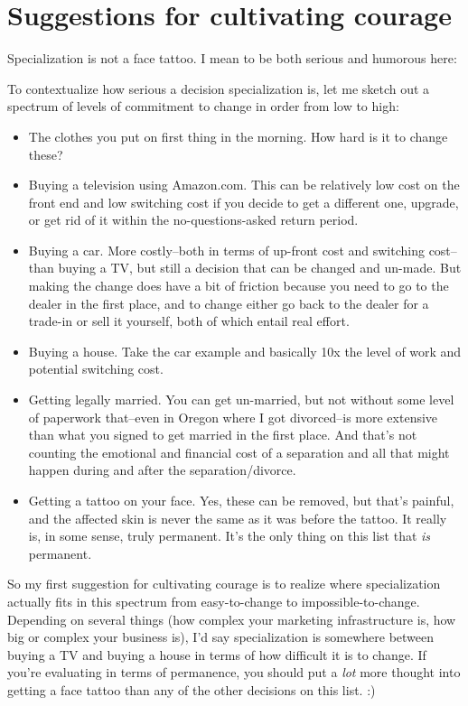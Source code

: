 \section{Suggestions for cultivating courage}

Specialization is not a face tattoo. I mean to be both serious and humorous here:

To contextualize how serious a decision specialization is, let me sketch out a spectrum of levels of commitment  to change in order from low to high:

\begin{itemize}
\item The clothes you put on first thing in the morning. How hard is it to change these?
\item Buying a television using Amazon.com. This can be relatively low cost on the front end and low switching cost if you decide to get a different one, upgrade, or get rid of it within the no-questions-asked return period.
\item Buying a car. More costly--both in terms of up-front cost and switching cost--than buying a TV, but still a decision that can be changed and un-made. But making the change does have a bit of friction because you need to go to the dealer in the first place, and to change either go back to the dealer for a trade-in or sell it yourself, both of which entail real effort.
\item Buying a house. Take the car example and basically 10x the level of work and potential switching cost.
\item Getting legally married. You can get un-married, but not without some level of paperwork that--even in Oregon where I got divorced--is more extensive than what you signed to get married in the first place. And that's not counting the emotional and financial cost of a separation and all that might happen during and after the separation/divorce.
\item Getting a tattoo on your face. Yes, these can be removed, but that's painful, and the affected skin is never the same as it was before the tattoo. It really is, in some sense, truly permanent. It's the only thing on this list that \emph{is} permanent.
\end{itemize}

So my first suggestion for cultivating courage is to realize where specialization actually fits in this spectrum from easy-to-change to impossible-to-change. Depending on several things (how complex your marketing infrastructure is, how big or complex your business is), I'd say specialization is somewhere between buying a TV and buying a house in terms of how difficult it is to change. If you're evaluating in terms of permanence, you should put a \emph{lot} more thought into getting a face tattoo than any of the other decisions on this list. :)

